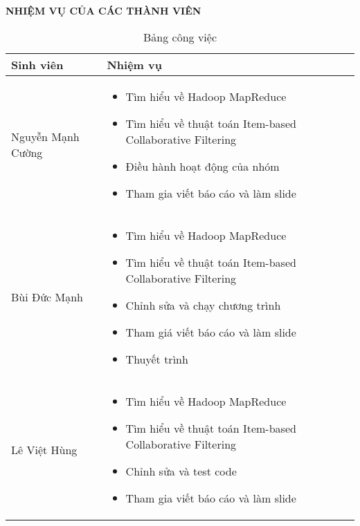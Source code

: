 \vfill
\LARGE \centering \textbf{NHIỆM VỤ CỦA CÁC THÀNH VIÊN}
\vspace{0.5cm}
\begin{table}[h!]
    \centering
    \hspace*{-1.2cm}
    \begin{tabular}{|l|p{10cm}|}
        \hline
        \textbf{Sinh viên} & \textbf{Nhiệm vụ}                         \\
        \hline
        Nguyễn Mạnh Cường  &
        \begin{itemize}
            \item Tìm hiểu về Hadoop MapReduce
            \item Tìm hiểu về thuật toán Item-based Collaborative Filtering
            \item Điều hành hoạt động của nhóm
            \item Tham gia viết báo cáo và làm slide
        \end{itemize} \\
        \hline
        Bùi Đức Mạnh       &
        \begin{itemize}
            \item Tìm hiểu về Hadoop MapReduce
            \item Tìm hiểu về thuật toán Item-based Collaborative Filtering
            \item Chỉnh sửa và chạy chương trình
            \item Tham giá viết báo cáo và làm slide
            \item Thuyết trình
        \end{itemize} \\
        \hline
        Lê Việt Hùng       &
        \begin{itemize}
            \item Tìm hiểu về Hadoop MapReduce
            \item Tìm hiểu về thuật toán Item-based Collaborative Filtering
            \item Chỉnh sửa và test code
            \item Tham gia viết báo cáo và làm slide
        \end{itemize} \\
        \hline
    \end{tabular}
    \caption{Bảng công việc}
    \label{tab:my_label}
\end{table}